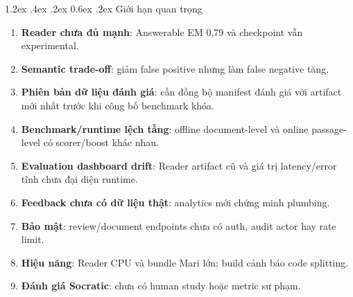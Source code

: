 \documentclass[12pt,a4paper,oneside]{report}
\makeatletter
\renewcommand\section{\@startsection {section}{1}{\z@}%
  {1.2ex \@plus .4ex \@minus .2ex}%
  {0.6ex \@plus .2ex}%
  {\normalfont\Large\bfseries}}
\makeatother
\begin{document}
\section{Giới hạn quan trọng}
\begin{enumerate}
  \item \textbf{Reader chưa đủ mạnh}: Answerable EM 0,79 và checkpoint vẫn experimental.
  \item \textbf{Semantic trade-off}: giảm false positive nhưng làm false negative tăng.
  \item \textbf{Phiên bản dữ liệu đánh giá}: cần đồng bộ manifest đánh giá với artifact mới nhất trước khi công bố benchmark khóa.
  \item \textbf{Benchmark/runtime lệch tầng}: offline document-level và online
  passage-level có scorer/boost khác nhau.
  \item \textbf{Evaluation dashboard drift}: Reader artifact cũ và giá trị latency/error
  tĩnh chưa đại diện runtime.
  \item \textbf{Feedback chưa có dữ liệu thật}: analytics mới chứng minh plumbing.
  \item \textbf{Bảo mật}: review/document endpoints chưa có auth, audit actor hay rate limit.
  \item \textbf{Hiệu năng}: Reader CPU và bundle Mari lớn; build cảnh báo code splitting.
  \item \textbf{Đánh giá Socratic}: chưa có human study hoặc metric sư phạm.
\end{enumerate}
\end{document}
